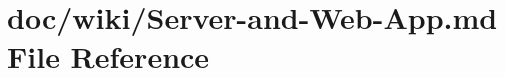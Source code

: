 \hypertarget{_server-and-_web-_app_8md}{}\section{doc/wiki/\+Server-\/and-\/\+Web-\/\+App.md File Reference}
\label{_server-and-_web-_app_8md}
